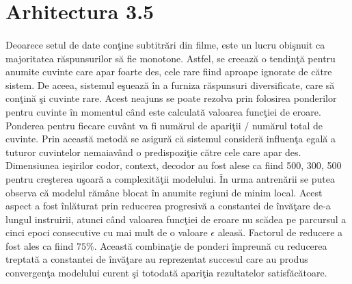 \section{Arhitectura 3.5}

\paragraph{}
Deoarece setul de date con\c tine subtitr\u ari din filme, este un lucru obi\c snuit ca majoritatea r\u aspunsurilor s\u a fie monotone. Astfel, se creeaz\u a o tendin\c t\u a pentru anumite cuvinte care apar foarte des, cele rare fiind aproape ignorate de c\u atre sistem. De aceea, sistemul e\c sueaz\u a \^ in a furniza r\u aspunsuri diversificate, care s\u a con\c tin\u a \c si cuvinte rare. Acest neajuns se poate rezolva prin folosirea ponderilor pentru cuvinte \^ in momentul c\^ and este calculat\u a valoarea func\c tiei de eroare. Ponderea pentru fiecare cuv\^ ant va fi num\u arul de apari\c tii \(/\) num\u arul total de cuvinte. Prin aceast\u a metod\u a se asigur\u a c\u a sistemul consider\u a influen\c ta egal\u a a tuturor cuvintelor nemaiav\^ and o predispozi\c tie c\u atre cele care apar des. Dimensiunea ie\c sirilor codor, context, decodor au fost alese ca fiind 500, 300, 500 pentru cre\c sterea u\c soar\u a a complexit\u a\c tii modelului. \^ In urma antren\u arii se putea observa c\u a modelul r\u am\^ ane blocat \^ in anumite regiuni de minim local. Acest aspect a fost \^ inl\u aturat prin reducerea progresiv\u a a constantei de \^ inv\u a\c tare de-a lungul instruirii, atunci c\^ and valoarea func\c tiei de eroare nu sc\u adea pe parcursul a cinci epoci consecutive cu mai mult de o valoare \(\epsilon\) aleas\u a. Factorul de reducere a fost ales ca fiind \(75\%\). Aceast\u a combina\c tie de ponderi \^ impreun\u a cu reducerea treptat\u a a constantei de \^ inv\u a\c tare au reprezentat succesul care au produs convergen\c ta modelului curent \c si totodat\u a apari\c tia rezultatelor satisf\u ac\u atoare.








